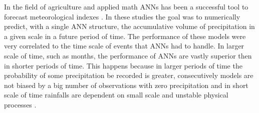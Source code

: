 
In the field of agriculture and applied math ANNs has been a successful tool to forecast meteorological indexes  \cite{kumarasiri2006rainfall, nasseri2008optimized, ramirez2006linear, luk2000study, french1992rainfall, toth2000comparison, partal2015daily}. In these studies the goal was to numerically predict, with a single ANN structure, the accumulative volume of precipitation in a given scale in a future period of time. The performance of these models were very correlated to the time scale of events that ANNs had to handle. In larger scale of time, such as months, the performance of ANNs are vastly superior then in shorter periods of time. This happens because in larger periods of time the probability of some precipitation be recorded is greater, consecutively models are not biased by a big number of observations with zero precipitation \cite{schoof2001downscaling} and in short scale of time rainfalls are dependent on small scale and unstable physical processes \cite{kuligowski1998localized}.

